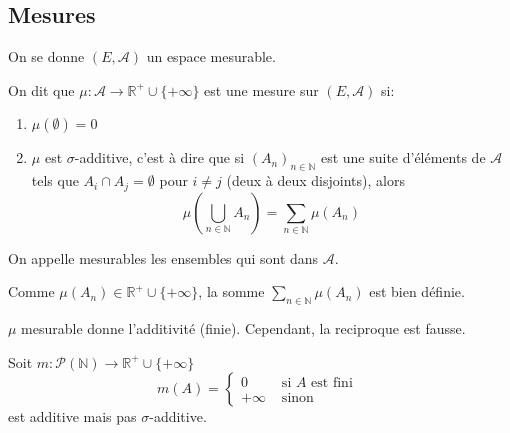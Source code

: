 
\subsection{Mesures}

On se donne $(E, \mathscr{A})$ un espace mesurable.

\begin{definition}[Mesure]
	On dit que $\mu : \mathscr{A} \to \mathbb{R}^+\cup \{+\infty\}$ est une mesure sur $(E, \mathscr{A})$ si:
	\begin{enumerate}
		\item $\mu(\emptyset) = 0$
		\item $\mu$ est $\sigma$-additive, c'est à dire que si $(A_n)_{n \in \mathbb{N}}$ est une suite d'éléments de $\mathscr{A}$
		      tels que $A_i \cap A_j = \emptyset$ pour $i \neq j$ (deux à deux disjoints), alors
		      \begin{equation*}
			      \mu\left(\bigcup\limits_{n \in \mathbb{N}} A_n\right) = \sum\limits_{n \in \mathbb{N}} \mu(A_n)
		      \end{equation*}
	\end{enumerate}
\end{definition}

\begin{remarque}
	On appelle mesurables les ensembles qui sont dans $\mathscr{A}$.
\end{remarque}

\begin{remarque}
	Comme $\mu (A_n) \in \mathbb{R}^+ \cup \{+\infty\}$, la somme $\sum\limits_{n \in \mathbb{N}} \mu(A_n)$ est bien définie.
\end{remarque}

\begin{remarque}
	$\mu$ mesurable donne l'additivité (finie). Cependant, la reciproque est fausse.
	\begin{example}
		Soit $m: \mathscr{P}(\mathbb{N}) \to \mathbb{R}^+ \cup \{+\infty\}$
		\begin{equation*}
			m(A) = \left\{
			\begin{array}{ll}
				0       & \text{ si } A \text{ est fini } \\
				+\infty & \text{ sinon }
			\end{array}
			\right.
		\end{equation*}
		est additive mais pas $\sigma$-additive.
	\end{example}
\end{remarque}


